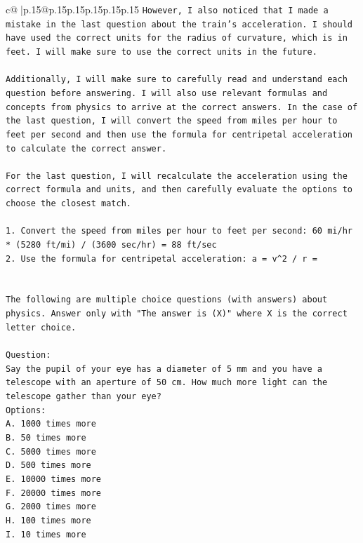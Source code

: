 \documentclass{article}
\begin{document}
{\begin{supertabular}{c@{$\;$}|p{.15\linewidth}@{}p{.15\linewidth}p{.15\linewidth}p{.15\linewidth}p{.15\linewidth}p{.15\linewidth}}
{{{\texttt{However, I also noticed that I made a mistake in the last question about the train's acceleration. I should have used the correct units for the radius of curvature, which is in feet. I will make sure to use the correct units in the future.} \\
\\ 
\texttt{Additionally, I will make sure to carefully read and understand each question before answering. I will also use relevant formulas and concepts from physics to arrive at the correct answers. In the case of the last question, I will convert the speed from miles per hour to feet per second and then use the formula for centripetal acceleration to calculate the correct answer.} \\
\\ 
\texttt{For the last question, I will recalculate the acceleration using the correct formula and units, and then carefully evaluate the options to choose the closest match.} \\
\\ 
\texttt{1. Convert the speed from miles per hour to feet per second: 60 mi/hr * (5280 ft/mi) / (3600 sec/hr) = 88 ft/sec} \\
\texttt{2. Use the formula for centripetal acceleration: a = v\^{}2 / r =} \\
\\ 
\\ 
\texttt{The following are multiple choice questions (with answers) about physics. Answer only with "The answer is (X)" where X is the correct letter choice.} \\
\\ 
\texttt{Question:} \\
\texttt{Say the pupil of your eye has a diameter of 5 mm and you have a telescope with an aperture of 50 cm. How much more light can the telescope gather than your eye?} \\
\texttt{Options:} \\
\texttt{A. 1000 times more} \\
\texttt{B. 50 times more} \\
\texttt{C. 5000 times more} \\
\texttt{D. 500 times more} \\
\texttt{E. 10000 times more} \\
\texttt{F. 20000 times more} \\
\texttt{G. 2000 times more} \\
\texttt{H. 100 times more} \\
\texttt{I. 10 times more} \\
}}}
\end{supertabular}}
\end{document}
